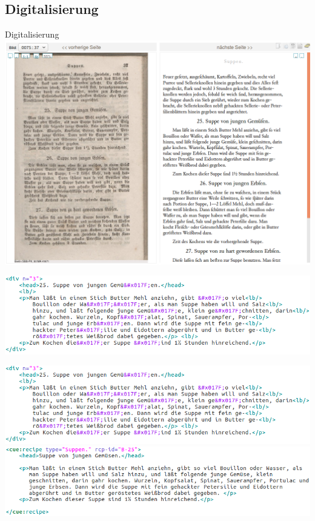 \documentclass[12pt]{beamer}
\newcommand{\myCite}[1]{{\scriptsize\parencite{#1}}}
\begin{document}
\subsection{Digitalisierung}
\begin{frame}{Digitalisierung}
	\myCite{DTA} \\
	\includegraphics[scale=0.3]{Images/BeispielSeite}
\end{frame}

\begin{frame}
	\includegraphics[scale=0.4]{Images/derenXML} \\
\end{frame}

\begin{frame}
	\includegraphics[scale=0.4]{Images/derenXML} \\
	\vspace{0.3cm}
	\hline
	\vspace{0.3cm}
	\includegraphics[scale=0.4]{Images/unserXML}
\end{frame}
\end{document}
